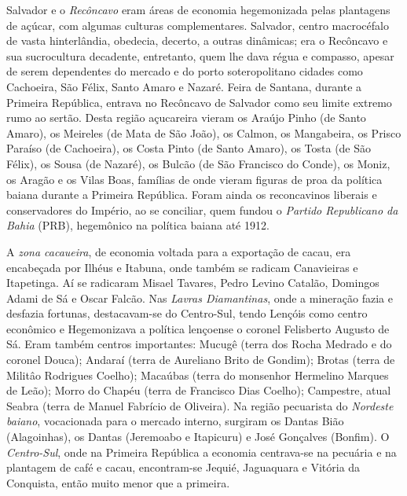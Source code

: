 Salvador e o \textit{Recôncavo} eram áreas de economia hegemonizada pelas plantagens de açúcar, com algumas culturas complementares. Salvador, centro macrocéfalo de vasta hinterlândia, obedecia, decerto, a outras dinâmicas; era o Recôncavo e sua sucrocultura decadente, entretanto, quem lhe dava régua e compasso, apesar de serem dependentes do mercado e do porto soteropolitano cidades como Cachoeira, São Félix, Santo Amaro e Nazaré. Feira de Santana, durante a Primeira República, entrava no Recôncavo de Salvador como seu limite extremo rumo ao sertão. Desta região açucareira vieram os Araújo Pinho (de Santo Amaro), os Meireles (de Mata de São João), os Calmon, os Mangabeira, os Prisco Paraíso (de Cachoeira), os Costa Pinto (de Santo Amaro), os Tosta (de São Félix), os Sousa (de Nazaré), os Bulcão (de São Francisco do Conde), os Moniz, os Aragão e os Vilas Boas, famílias de onde vieram figuras de proa da política baiana durante a Primeira República. Foram ainda os reconcavinos liberais e conservadores do Império, ao se conciliar, quem fundou o \textit{Partido Republicano da Bahia} (PRB), hegemônico na política baiana até 1912.

A \textit{zona cacaueira}, de economia voltada para a exportação de cacau, era encabeçada por Ilhéus e Itabuna, onde também se radicam Canavieiras e Itapetinga. Aí se radicaram Misael Tavares, Pedro Levino Catalão, Domingos Adami de Sá e Oscar Falcão. Nas \textit{Lavras Diamantinas}, onde a mineração fazia e desfazia fortunas, destacavam-se do Centro-Sul, tendo Lençóis como centro econômico e Hegemonizava a política lençoense o coronel Felisberto Augusto de Sá. Eram também centros importantes: Mucugê (terra dos Rocha Medrado e do coronel Douca); Andaraí (terra de Aureliano Brito de Gondim); Brotas (terra de Militâo Rodrigues Coelho); Macaúbas (terra do monsenhor Hermelino Marques de Leão); Morro do Chapéu (terra de Francisco Dias Coelho); Campestre, atual Seabra (terra de Manuel Fabrício de Oliveira). Na região pecuarista do \textit{Nordeste baiano}, vocacionada para o mercado interno,  surgiram os Dantas Bião (Alagoinhas), os Dantas (Jeremoabo e Itapicuru) e José Gonçalves (Bonfim). O \textit{Centro-Sul}, onde na Primeira República a economia centrava-se na pecuária e na plantagem de café e cacau, encontram-se Jequié, Jaguaquara e Vitória da Conquista, então muito menor que a primeira. 

